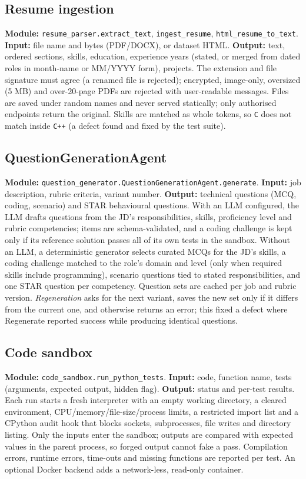 \subsection{Resume ingestion}
\textbf{Module:} \texttt{resume\_parser.extract\_text}, \texttt{ingest\_resume}, \texttt{html\_resume\_to\_text}.
\textbf{Input:} file name and bytes (PDF/DOCX), or dataset HTML. \textbf{Output:} text, ordered sections, skills, education, experience years (stated, or merged from dated roles in month-name or MM/YYYY form), projects.
The extension and file signature must agree (a renamed file is rejected); encrypted, image-only, oversized (5 MB) and over-20-page PDFs are rejected with user-readable messages. Files are saved under random names and never served statically; only authorised endpoints return the original. Skills are matched as whole tokens, so \texttt{C} does not match inside \texttt{C++} (a defect found and fixed by the test suite).

\subsection{QuestionGenerationAgent}
\textbf{Module:} \texttt{question\_generator.QuestionGenerationAgent.generate}.
\textbf{Input:} job description, rubric criteria, variant number. \textbf{Output:} technical questions (MCQ, coding, scenario) and STAR behavioural questions.
With an LLM configured, the LLM drafts questions from the JD's responsibilities, skills, proficiency level and rubric competencies; items are schema-validated, and a coding challenge is kept only if its reference solution passes all of its own tests in the sandbox. Without an LLM, a deterministic generator selects curated MCQs for the JD's skills, a coding challenge matched to the role's domain and level (only when required skills include programming), scenario questions tied to stated responsibilities, and one STAR question per competency. Question sets are cached per job and rubric version. \emph{Regeneration} asks for the next variant, saves the new set only if it differs from the current one, and otherwise returns an error; this fixed a defect where Regenerate reported success while producing identical questions.

\subsection{Code sandbox}
\textbf{Module:} \texttt{code\_sandbox.run\_python\_tests}.
\textbf{Input:} code, function name, tests (arguments, expected output, hidden flag). \textbf{Output:} status and per-test results.
Each run starts a fresh interpreter with an empty working directory, a cleared environment, CPU/memory/file-size/process limits, a restricted import list and a CPython audit hook that blocks sockets, subprocesses, file writes and directory listing. Only the inputs enter the sandbox; outputs are compared with expected values in the parent process, so forged output cannot fake a pass. Compilation errors, runtime errors, time-outs and missing functions are reported per test. An optional Docker backend adds a network-less, read-only container.

